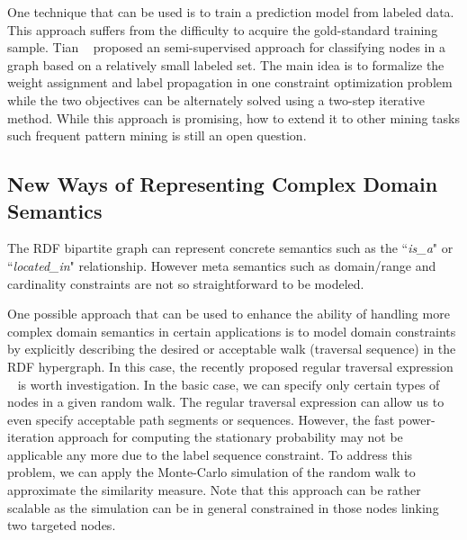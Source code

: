 One technique that can be used is to train a prediction model from labeled data. This approach suffers from the difficulty to acquire the gold-standard training sample. Tian \etal~\cite{Tian2009AHyper} proposed an semi-supervised approach for classifying nodes in a graph based on a relatively small labeled set. The main idea is to formalize the weight assignment and label propagation in one constraint optimization problem while the two objectives can be alternately solved using a two-step iterative method. While this approach is promising, how to extend it to other mining tasks such frequent pattern mining is still an open question.

\subsection{New Ways of Representing Complex Domain Semantics}
The RDF bipartite graph can represent concrete semantics such as the ``\emph{is\_a}" or ``\emph{located\_in}" relationship. However meta semantics such as domain/range and cardinality constraints are not so straightforward to be modeled.

One possible approach that can be used to enhance the ability of handling more complex domain semantics in certain applications is to model domain constraints by explicitly describing the desired or acceptable walk (traversal sequence) in the RDF hypergraph. In this case, the recently proposed regular traversal expression ~\cite{Marko10} is worth investigation. In the basic case, we can specify only certain types of nodes in a given random walk. The regular traversal expression can allow us to even specify acceptable path segments or sequences. However, the fast power-iteration approach for computing the stationary probability may not be applicable any more due to the label sequence constraint. To address this problem, we can apply the Monte-Carlo simulation of the random walk to approximate the similarity measure. Note that this approach can be rather scalable as the simulation can be in general constrained in those nodes linking two targeted nodes.

